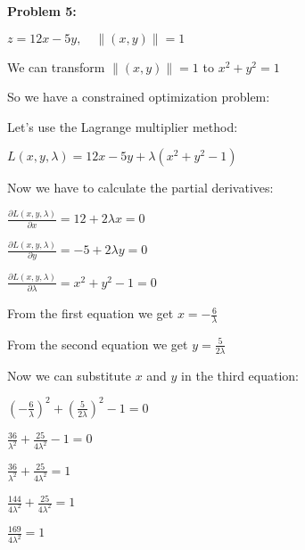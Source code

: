 \textbf{Problem 5:}

\singlespacing

$z = 12x - 5y,\quad \lVert (x, y)\rVert = 1 $

\singlespacing

We can transform $\lVert (x, y)\rVert = 1$ to $x^2 + y^2 = 1$

\singlespacing

So we have a constrained optimization problem:

\singlespacing

Let's use the Lagrange multiplier method:

\singlespacing

$L(x, y, \lambda) = 12x - 5y + \lambda(x^2 + y^2 - 1)$

\singlespacing

Now we have to calculate the partial derivatives:

\singlespacing

$\frac{\partial L(x, y, \lambda)}{\partial x} = 12 + 2\lambda x = 0$

\singlespacing

$\frac{\partial L(x, y, \lambda)}{\partial y} = -5 + 2\lambda y = 0$

\singlespacing

$\frac{\partial L(x, y, \lambda)}{\partial \lambda} = x^2 + y^2 - 1 = 0$

\singlespacing

From the first equation we get $x = -\frac{6}{\lambda}$

\singlespacing

From the second equation we get $y = \frac{5}{2\lambda}$

\singlespacing

Now we can substitute $x$ and $y$ in the third equation:

\singlespacing

$\left(-\frac{6}{\lambda}\right)^2 + \left(\frac{5}{2\lambda}\right)^2 - 1 = 0$

\singlespacing

$\frac{36}{\lambda^2} + \frac{25}{4\lambda^2} - 1 = 0$

\singlespacing

$\frac{36}{\lambda^2} + \frac{25}{4\lambda^2} = 1$

\singlespacing

$\frac{144}{4\lambda^2} + \frac{25}{4\lambda^2} = 1$

\singlespacing

$\frac{169}{4\lambda^2} = 1$

